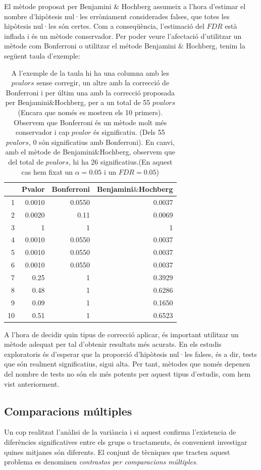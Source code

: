 \documentclass[english]{article}
\begin{document}
El mètode proposat per Benjamini $\&$ Hochberg assumeix a l'hora d'estimar el nombre d'hipòtesis nul·les erròniament considerades falses, que totes les hipòtesis nul·les són certes. Com a conseqüència, l'estimació del $FDR$ està inflada i és un mètode conservador. Per poder veure l'afectació d'utilitzar un mètode com Bonferroni o utilitzar el métode Benjamini $\&$ Hochberg, tenim la següent taula d'exemple:
\\
\begin{table}[ht]
\centering
\begin{tabular}{rrrr}
\hline
& Pvalor & Bonferroni & Benjamini$\&$Hochberg \\
\hline
1 & 0.0010 & 0.0550 & 0.0037 \\
2 & 0.0020 & 0.11 & 0.0069 \\
3 & 1 & 1 & 1 \\
4 & 0.0010 & 0.0550 & 0.0037 \\
5 & 0.0010 & 0.0550 & 0.0037 \\
6 & 0.0010 & 0.0550 & 0.0037 \\
7 & 0.25 & 1 & 0.3929 \\
8 & 0.48 & 1 & 0.6286 \\
9 & 0.09 & 1 & 0.1650 \\
10 & 0.51 & 1 & 0.6523 \\
\hline
\end{tabular}
\caption{A l'exemple de la taula hi ha una columna amb les $pvalors$ sense corregir, un altre amb la correcció de Bonferroni i per últim una amb la correcció proposada per Benjamini$\&$Hochberg, per a un total de 55 $pvalors$ (Encara que només es mostren els 10 primers). Observem que Bonferroni és un mètode molt més conservador i cap $pvalor$ és significatiu. (Dels 55 $pvalors$, 0 són significatius amb Bonferroni). En canvi, amb el mètode de Benjamini$\&$Hochberg, observem que del total de $pvalors$, hi ha 26 significatius.(En aquest cas hem fixat un $\alpha=0.05$ i un $FDR=0.05$) }
\end{table}

A l'hora de decidir quin tipus de correcció aplicar, és important utilitzar un mètode adequat per tal d'obtenir resultats més acurats. En els estudis exploratoris és d'esperar que la proporció d'hipòtesis nul·les falses, és a dir, tests que són realment significatius, sigui alta. Per tant, mètodes que només depenen del nombre de tests no són els més potents per aquest tipus d'estudis, com hem vist anteriorment.

\subsection{Comparacions múltiples}
Un cop realitzat l'anàlisi de la variància i si aquest confirma l'existencia de diferències significatives entre els grups o tractaments, és convenient investigar quines mitjanes són diferents. El conjunt de tècniques que tracten aquest problema es denominen \textit{contrastos per comparacions múltiples}.
\\
\end{document}
